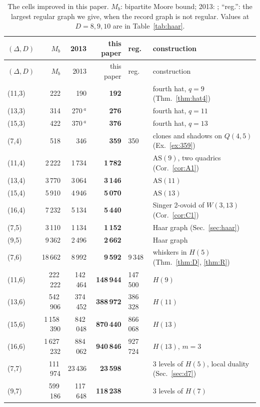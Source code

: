 \documentclass[11pt]{amsart}
\theoremstyle{definition}
\theoremstyle{remark}
\numberwithin{equation}{section}
\newcommand{\AS}{\mathrm{AS}}
\newcommand{\Mb}{M_b}
\begin{document}
\begin{longtable}{@{}l r r r l l@{}}
\caption{The cells improved in this paper. $\Mb$: bipartite Moore bound; 2013: \cite[Table 4]{MS13}; ``reg.'': the
largest regular graph we give, when the record graph is not regular. Values at $D=8,9,10$ are in
Table~\ref{tab:haar}.}\label{tab:summary}\\
\toprule
$(\Delta,D)$ & $\Mb$ & 2013 & this paper & reg. & construction \\
\midrule\endfirsthead
\toprule
$(\Delta,D)$ & $\Mb$ & 2013 & this paper & reg. & construction \\
\midrule\endhead
\bottomrule\endfoot
(11,3) & 222 & 190 & \textbf{192} & & fourth hat, $q=9$ (Thm.~\ref{thm:hat4}) \\
(13,3) & 314 & 270\,$^a$ & \textbf{276} & & fourth hat, $q=11$ \\
(15,3) & 422 & 370\,$^a$ & \textbf{376} & & fourth hat, $q=13$ \\
(7,4) & 518 & 346 & \textbf{359} & 350 & clones and shadows on $Q(4,5)$ (Ex.~\ref{ex:359}) \\
(11,4) & 2\,222 & 1\,734 & \textbf{1\,782} & & $\AS(9)$, two quadrics (Cor.~\ref{cor:A1}) \\
(13,4) & 3\,770 & 3\,064 & \textbf{3\,146} & & $\AS(11)$ \\
(15,4) & 5\,910 & 4\,946 & \textbf{5\,070} & & $\AS(13)$ \\
(16,4) & 7\,232 & 5\,134 & \textbf{5\,440} & & Singer 2-ovoid of $W(3,13)$ (Cor.~\ref{cor:C1}) \\
(7,5) & 3\,110 & 1\,134 & \textbf{1\,152} & & Haar graph (Sec.~\ref{sec:haar}) \\
(9,5) & 9\,362 & 2\,496 & \textbf{2\,662} & & Haar graph \\
(7,6) & 18\,662 & 8\,992 & \textbf{9\,592} & 9\,348 & whiskers in $H(5)$ (Thm.~\ref{thm:D}, \ref{thm:R}) \\
(11,6) & 222\,222 & 142\,464 & \textbf{148\,944} & 147\,500 & $H(9)$ \\
(13,6) & 542\,906 & 374\,452 & \textbf{388\,972} & 386\,328 & $H(11)$ \\
(15,6) & 1\,158\,390 & 842\,048 & \textbf{870\,440} & 866\,068 & $H(13)$ \\
(16,6) & 1\,627\,232 & 884\,062 & \textbf{940\,846} & 927\,724 & $H(13)$, $m=3$ \\
(7,7) & 111\,974 & 23\,436 & \textbf{23\,598} & & 3 levels of $H(5)$, local duality (Sec.~\ref{sec:d7}) \\
(9,7) & 599\,186 & 117\,648 & \textbf{118\,238} & & 3 levels of $H(7)$ \\

\end{longtable}
\end{document}
